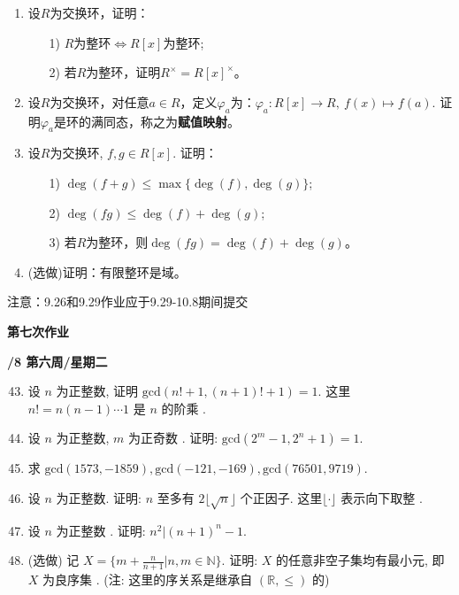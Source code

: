 \documentclass[a4paper,12pt]{article}
\begin{document}
\begin{enumerate}
     \item 设$R$为交换环，证明：
     \begin{itemize}
         \item[1)] $R$为整环$\iff R[x]$为整环;
         \item[2)] 若$R$为整环，证明$R^{\times}=R[x]^{\times}$。
     \end{itemize}

     \item 设$R$为交换环，对任意$ a \in R$，定义$\varphi_a$为：$\varphi_a: R[x] \rightarrow R, \  f(x) \mapsto f(a)$. 证明$\varphi_a$是环的满同态，称之为\textbf{赋值映射}。

     \item 设$R$为交换环, $f,g \in R[x]$. 证明：
     \begin{itemize}
         \item[1)] $\deg(f+g) \leq \max\{\deg(f), \deg(g)\}$;
         \item[2)] $\deg(fg) \leq \deg(f)+\deg(g)$;
         \item[3)] 若$R$为整环，则$\deg(fg) = \deg(f)+\deg(g)$。
     \end{itemize}

     \item {\color{red} (选做)}证明：有限整环是域。
     
 \end{enumerate}

{\color{red} 注意：9.26和9.29作业应于9.29-10.8期间提交}


\newpage
\head

 \begin{center} %
	{\Large \bf 第七次作业} %
	\vspace{2mm}
	
	{\bf{}/8 \quad  第六周/星期二} %
\end{center} 

\begin{enumerate}\setcounter{enumi}{42}
        \item 设 $n$ 为正整数, 证明 $\text{gcd}(n!+1,(n+1)!+1)=1$. 这里 $n!=n(n-1)\cdots1$ 是 $n$ 的阶乘 .
   
        \item 设 $n$ 为正整数, $m$ 为正奇数 . 证明: $\text{gcd}(2^m-1,2^n+1)=1$. 
   
        \item 求 $\text{gcd}(1573,-1859),\text{gcd}(-121,-169),\text{gcd}(76501,9719)$.
   
        \item 设 $n$ 为正整数. 证明: $n$ 至多有 $2\lfloor\sqrt{n}\rfloor$ 个正因子. 这里$\lfloor ·\rfloor$ 表示向下取整 .
   
        \item 设 $n$ 为正整数 . 证明: $n^2|(n+1)^n-1$.
   
        \item  {\color{red} (选做)} 记 $X=\{m+\frac{n}{n+1}|n,m\in\mathbb{N}\}$. 证明: $X$ 的任意非空子集均有最小元, 即 $X$ 为良序集 . (注: 这里的序关系是继承自 $(\mathbb{R},\leq)$ 的)
\end{enumerate}
\end{document}
